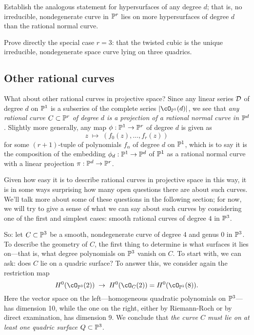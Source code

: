 \begin{exercise}
Establish the analogous statement for hypersurfaces of any degree $d$; that is, no irreducible, nondegenerate curve in $\PP^r$ lies on more hypersurfaces of degree $d$ than the rational normal curve.
\end{exercise}

\begin{exercise}
Prove directly  the special case $r=3$: that the twisted cubic is the unique irreducible, nondegenerate space curve lying on three quadrics.
\end{exercise}


\subsection{Other rational curves}

What about other rational curves in projective space? Since any linear series $\cD$ of degree $d$ on $\PP^1$ is a subseries of the complete series $|\cO_{\PP^1}(d)|$, we see that \emph{any rational curve $C \subset \PP^r$ of degree $d$ is a projection of a rational normal curve in $\PP^d$}. Slightly more generally, any map $\phi : \PP^1 \to \PP^r$ of degree $d$ is given as
$$
z \; \mapsto \; (f_0(z), \dots, f_r(z))
$$
for some $(r+1)$-tuple of polynomials $f_\alpha$ of degree $d$ on $\PP^1$, which is to say it is the composition of the embedding $\phi_d : \PP^1 \to \PP^d$ of $\PP^1$ as a rational normal curve with a linear projection $\pi : \PP^d \to \PP^r$. 

Given how easy it is to describe rational curves in projective space in this way, it is in some ways surprising how many open questions there are about such curves. We'll talk more about some of these questions in the following section; for now, we will try to give a sense of what we can say about such curves by considering one of the first and simplest cases: smooth rational curves of degree $4$ in $\PP^3$.

So: let $C \subset \PP^3$ be a smooth, nondegenerate curve of degree 4 and genus 0 in $\PP^3$. To describe the geometry of $C$, the first thing to determine is what surfaces it lies on---that is, what degree polynomials on $\PP^3$ vanish on $C$. 
To start with, we can ask: does $C$ lie on a quadric surface? To answer this, we consider again the restriction map
$$
H^0(\cO_{\PP^3}(2)) \; \to \; H^0(\cO_{C}(2)) = H^0(\cO_{\PP^1}(8)).
$$
Here the vector space on the left---homogeneous quadratic polynomials on $\PP^3$---has dimension 10, while the one on the right, either by Riemann-Roch or by direct examination, has dimension 9. We conclude that \emph{the curve $C$ must lie on at least one quadric surface $Q \subset \PP^3$}.

